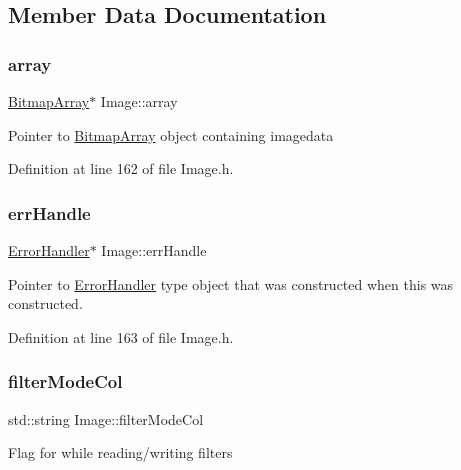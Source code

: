 \subsection{Member Data Documentation}
\mbox{\label{classImage_a1c18dd7d9eda416d44e7eb408d5b3c38}} 
\subsubsection{\texorpdfstring{array}{array}}
{\footnotesize\ttfamily \mbox{\hyperlink{classBitmapArray}{Bitmap\+Array}}$\ast$ Image\+::array\hspace{0.3cm}{\ttfamily [protected]}}

Pointer to \mbox{\hyperlink{classBitmapArray}{Bitmap\+Array}} object containing imagedata 

Definition at line 162 of file Image.\+h.

\mbox{\label{classImage_a560753c20e67a544be57bba971021375}} 
\subsubsection{\texorpdfstring{errHandle}{errHandle}}
{\footnotesize\ttfamily \mbox{\hyperlink{classErrorHandler}{Error\+Handler}}$\ast$ Image\+::err\+Handle\hspace{0.3cm}{\ttfamily [protected]}}

Pointer to \mbox{\hyperlink{classErrorHandler}{Error\+Handler}} type object that was constructed when this was constructed. 

Definition at line 163 of file Image.\+h.

\mbox{\label{classImage_a0b4e4d5994ff72c9f3c99913037c627f}} 
\subsubsection{\texorpdfstring{filterModeCol}{filterModeCol}}
{\footnotesize\ttfamily std\+::string Image\+::filter\+Mode\+Col\hspace{0.3cm}{\ttfamily [protected]}}

Flag for while reading/writing filters 

